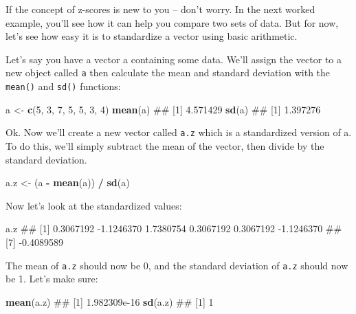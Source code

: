 \documentclass[]{book}
\newenvironment{Shaded}{\begin{snugshade}}{\end{snugshade}}
\newcommand{\KeywordTok}[1]{\textcolor[rgb]{0.13,0.29,0.53}{\textbf{#1}}}
\newcommand{\DecValTok}[1]{\textcolor[rgb]{0.00,0.00,0.81}{#1}}
\newcommand{\StringTok}[1]{\textcolor[rgb]{0.31,0.60,0.02}{#1}}
\newcommand{\OperatorTok}[1]{\textcolor[rgb]{0.81,0.36,0.00}{\textbf{#1}}}
\newcommand{\NormalTok}[1]{#1}
\theoremstyle{definition}
\theoremstyle{definition}
\theoremstyle{remark}
\begin{document}
If the concept of z-scores is new to you -- don't worry. In the next
worked example, you'll see how it can help you compare two sets of data.
But for now, let's see how easy it is to standardize a vector using
basic arithmetic.

Let's say you have a vector a containing some data. We'll assign the
vector to a new object called \texttt{a} then calculate the mean and
standard deviation with the \texttt{mean()} and \texttt{sd()} functions:

\begin{Shaded}
\begin{Highlighting}[]
\NormalTok{a <-}\StringTok{ }\KeywordTok{c}\NormalTok{(}\DecValTok{5}\NormalTok{, }\DecValTok{3}\NormalTok{, }\DecValTok{7}\NormalTok{, }\DecValTok{5}\NormalTok{, }\DecValTok{5}\NormalTok{, }\DecValTok{3}\NormalTok{, }\DecValTok{4}\NormalTok{)}
\KeywordTok{mean}\NormalTok{(a)}
\NormalTok{## [1] 4.571429}
\KeywordTok{sd}\NormalTok{(a)}
\NormalTok{## [1] 1.397276}
\end{Highlighting}
\end{Shaded}

Ok. Now we'll create a new vector called \texttt{a.z} which is a
standardized version of a. To do this, we'll simply subtract the mean of
the vector, then divide by the standard deviation.

\begin{Shaded}
\begin{Highlighting}[]
\NormalTok{a.z <-}\StringTok{ }\NormalTok{(a }\OperatorTok{-}\StringTok{ }\KeywordTok{mean}\NormalTok{(a)) }\OperatorTok{/}\StringTok{ }\KeywordTok{sd}\NormalTok{(a)}
\end{Highlighting}
\end{Shaded}

Now let's look at the standardized values:

\begin{Shaded}
\begin{Highlighting}[]
\NormalTok{a.z}
\NormalTok{## [1]  0.3067192 -1.1246370  1.7380754  0.3067192  0.3067192 -1.1246370}
\NormalTok{## [7] -0.4089589}
\end{Highlighting}
\end{Shaded}

The mean of \texttt{a.z} should now be 0, and the standard deviation of
\texttt{a.z} should now be 1. Let's make sure:

\begin{Shaded}
\begin{Highlighting}[]
\KeywordTok{mean}\NormalTok{(a.z)}
\NormalTok{## [1] 1.982309e-16}
\KeywordTok{sd}\NormalTok{(a.z)}
\NormalTok{## [1] 1}
\end{Highlighting}
\end{Shaded}
\end{document}
